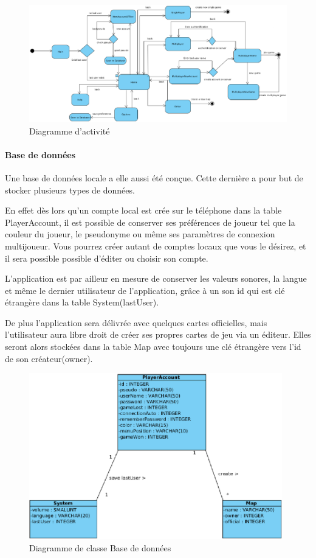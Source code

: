 	\begin{figure}
		\label{activité}
		\includegraphics[width=23cm, angle=90]{Analyse/Img/diag_activity.eps}
		\caption{Diagramme d'activité}
	\end{figure}

	\paragraph{Base de données\\}
			
		Une base de données locale a elle aussi été conçue. Cette dernière a pour
		but de stocker plusieurs types de données.
				
		En effet dès lors qu'un compte local est crée sur le téléphone dans la
		table PlayerAccount, il est possible de conserver ses préférences de joueur
		tel que la couleur du joueur, le pseudonyme ou même ses paramètres de connexion multijoueur. 
		Vous pourrez créer autant de comptes locaux que vous le désirez, et il
		sera possible possible d'éditer ou choisir son compte.
				
		L'application est par ailleur en mesure de conserver
		les valeurs sonores, la langue et même le dernier utilisateur de
		l'application, grâce à un son id qui est clé étrangère dans la table System(lastUser).
				
		De plus l'application sera délivrée avec quelques cartes officielles, mais
		l'utilisateur aura libre droit de créer ses propres cartes de jeu via un
		éditeur. Elles seront alors stockées dans la table Map avec toujours une
		clé étrangère vers l'id de son créateur(owner). \\
		
		\newpage
				
		\begin{figure}
			\includegraphics[width=11cm]{./Analyse/Img/menu_bdd.eps}
			\caption{Diagramme de classe Base de données}
		\end{figure}
		
